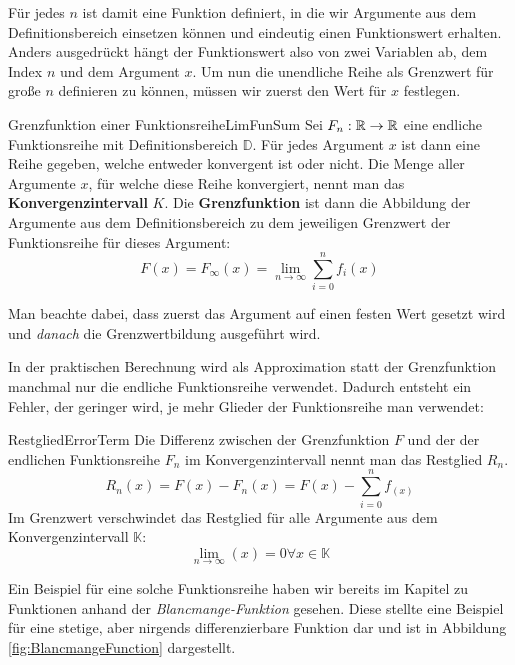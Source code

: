 Für jedes $n$ ist damit eine Funktion definiert, in die wir Argumente aus dem Definitionsbereich einsetzen können und eindeutig einen Funktionswert erhalten. Anders ausgedrückt hängt der Funktionswert also von zwei Variablen ab, dem Index $n$ und dem Argument $x$. Um nun die unendliche Reihe als Grenzwert für große $n$ definieren zu können, müssen wir zuerst den Wert für $x$ festlegen.

\begin{definition}{Grenzfunktion einer Funktionsreihe}{LimFunSum}
    Sei $F_n: \mathbb{R} \to \mathbb{R}$ eine endliche Funktionsreihe mit Definitionsbereich $\mathbb{D}$. Für jedes Argument $x$ ist dann eine Reihe gegeben, welche entweder konvergent ist oder nicht. Die Menge aller Argumente $x$, für welche diese Reihe konvergiert, nennt man das \textbf{Konvergenzintervall} $K$. Die \textbf{Grenzfunktion} ist dann die Abbildung der Argumente aus dem Definitionsbereich zu dem jeweiligen Grenzwert der Funktionsreihe für dieses Argument:
    $$
        F(x) = F_\infty(x) = \lim\limits_{n\to\infty} \sum\limits_{i=0}^n f_i(x)
    $$
\end{definition}

Man beachte dabei, dass zuerst das Argument auf einen festen Wert gesetzt wird und \emph{danach} die Grenzwertbildung ausgeführt wird.

In der praktischen Berechnung wird als Approximation statt der Grenzfunktion manchmal nur die endliche Funktionsreihe verwendet. Dadurch entsteht ein Fehler, der geringer wird, je mehr Glieder der Funktionsreihe man verwendet:

\begin{definition}{Restglied}{ErrorTerm}
    Die Differenz zwischen der Grenzfunktion $F$ und der der endlichen Funktionsreihe $F_n$ im Konvergenzintervall nennt man das Restglied $R_n$.
    $$
        R_n(x) = F(x) - F_n(x) = F(x) - \sum\limits_{i=0}^n f_(x)
    $$
    Im Grenzwert verschwindet das Restglied für alle Argumente aus dem Konvergenzintervall $\mathbb{K}$:
    $$
        \lim\limits_{n\to\infty}(x) = 0 \forall x \in \mathbb{K}
    $$
\end{definition}

Ein Beispiel für eine solche Funktionsreihe haben wir bereits im Kapitel zu Funktionen anhand der \emph{Blancmange-Funktion} gesehen. Diese stellte eine Beispiel für eine stetige, aber nirgends differenzierbare Funktion dar und ist in Abbildung \ref{fig:BlancmangeFunction} dargestellt.

